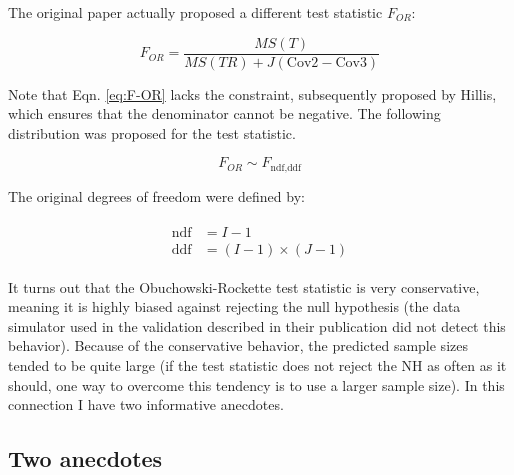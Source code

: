\documentclass[
]{book}
\begin{document}
The original paper \citep{RN1450} actually proposed a different test statistic \(F_{OR}\):

\begin{equation}
F_{OR}=\frac{MS(T)}{MS(TR)+J(\text{Cov2}-\text{Cov3})}
\label{eq:F-OR}
\end{equation}

Note that Eqn. \eqref{eq:F-OR} lacks the constraint, subsequently proposed by Hillis, which ensures that the denominator cannot be negative. The following distribution was proposed for the test statistic.

\begin{equation}
F_{OR}\sim F_{\text{ndf},\text{ddf}}
\label{eq:SamplingDistr-F-OR}
\end{equation}

The original degrees of freedom were defined by:

\begin{align}
\begin{split}
\text{ndf}&=I-1\\
\text{ddf}&=(I-1)\times(J-1)
\end{split}
\label{eq:ORdegreesOfFreedom}
\end{align}

It turns out that the Obuchowski-Rockette test statistic is very conservative, meaning it is highly biased against rejecting the null hypothesis (the data simulator used in the validation described in their publication did not detect this behavior). Because of the conservative behavior, the predicted sample sizes tended to be quite large (if the test statistic does not reject the NH as often as it should, one way to overcome this tendency is to use a larger sample size). In this connection I have two informative anecdotes.

\hypertarget{TwoAnecdotes}{%
\subsection{Two anecdotes}\label{TwoAnecdotes}}
\end{document}
